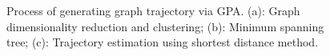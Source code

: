 \documentclass{article} %
\begin{document}
\begin{figure}[t]
    \centering
    \caption{Process of generating graph trajectory via GPA. (a): Graph dimensionality reduction and clustering; (b): Minimum spanning tree; (c): Trajectory estimation using shortest distance method.}
    \label{fig:trajectory_est}
\end{figure}
\end{document}
